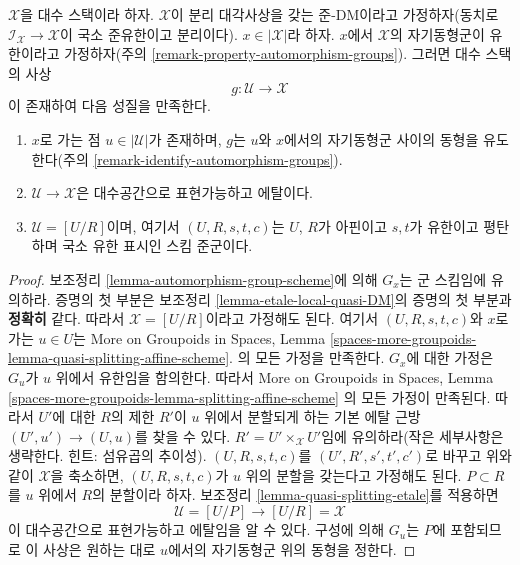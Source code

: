 \begin{lemma}
\label{lemma-etale-local-quasi-DM-at-x}
$\mathcal{X}$을 대수 스택이라 하자. $\mathcal{X}$이 분리 대각사상을 갖는
준-DM이라고 가정하자(동치로
$\mathcal{I}_\mathcal{X} \to \mathcal{X}$이 국소 준유한이고 분리이다).
$x \in |\mathcal{X}|$라 하자. $x$에서 $\mathcal{X}$의 자기동형군이
유한이라고 가정하자(주의 \ref{remark-property-automorphism-groups}).
그러면 대수 스택의 사상
$$
g : \mathcal{U} \longrightarrow \mathcal{X}
$$
이 존재하여 다음 성질을 만족한다.
\begin{enumerate}
\item $x$로 가는 점 $u \in |\mathcal{U}|$가 존재하며, $g$는 $u$와
$x$에서의 자기동형군 사이의 동형을 유도한다(주의
\ref{remark-identify-automorphism-groups}).
\item $\mathcal{U} \to \mathcal{X}$은 대수공간으로 표현가능하고 에탈이다.
\item $\mathcal{U} = [U/R]$이며, 여기서 $(U, R, s, t, c)$는 $U$, $R$가
아핀이고 $s, t$가 유한이고 평탄하며 국소 유한 표시인 스킴 준군이다.
\end{enumerate}
\end{lemma}

\begin{proof}
보조정리 \ref{lemma-automorphism-group-scheme}에 의해 $G_x$는 군
스킴임에 유의하라. 증명의 첫 부분은 보조정리
\ref{lemma-etale-local-quasi-DM}의 증명의 첫 부분과 {\bf 정확히} 같다.
따라서 $\mathcal{X} = [U/R]$이라고 가정해도 된다. 여기서
$(U, R, s, t, c)$와 $x$로 가는 $u \in U$는 More on Groupoids in Spaces,
Lemma
\ref{spaces-more-groupoids-lemma-quasi-splitting-affine-scheme}.
의 모든 가정을 만족한다. $G_x$에 대한 가정은 $G_u$가 $u$ 위에서
유한임을 함의한다. 따라서 More on Groupoids in Spaces, Lemma
\ref{spaces-more-groupoids-lemma-splitting-affine-scheme}
의 모든 가정이 만족된다. 따라서 $U'$에 대한 $R$의 제한 $R'$이 $u$
위에서 분할되게 하는 기본 에탈 근방 $(U', u') \to (U, u)$를 찾을 수
있다. $R' = U' \times_\mathcal{X} U'$임에 유의하라(작은 세부사항은
생략한다. 힌트: 섬유곱의 추이성). $(U, R, s, t, c)$를
$(U', R', s', t', c')$로 바꾸고 위와 같이 $\mathcal{X}$을 축소하면,
$(U, R, s, t, c)$가 $u$ 위의 분할을 갖는다고 가정해도 된다.
$P \subset R$를 $u$ 위에서 $R$의 분할이라 하자. 보조정리
\ref{lemma-quasi-splitting-etale}를 적용하면
$$
\mathcal{U} = [U/P] \longrightarrow [U/R] = \mathcal{X}
$$
이 대수공간으로 표현가능하고 에탈임을 알 수 있다. 구성에 의해
$G_u$는 $P$에 포함되므로 이 사상은 원하는 대로 $u$에서의
자기동형군 위의 동형을 정한다.
\end{proof}

